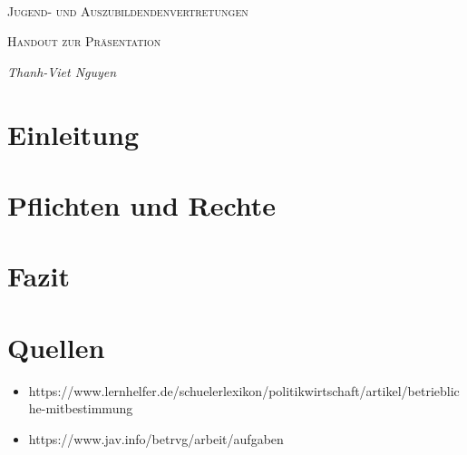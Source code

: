 \documentclass[
  a4paper,            %
  DIV=10,             %
  oneside,            %
  BCOR=5mm,           %
  parskip=half,       %
  numbers=noenddot    %
]{scrartcl}
\begin{document}
\begin{titlepage}
	\centering
	\text{}\vspace{3cm} \\
	{\scshape\LARGE Jugend- und Auszubildendenvertretungen \par}
	\vspace{1cm}
	{\scshape\Large 
		Handout zur Präsentation \par}
	\vspace{1.5cm}
	{\huge\bfseries \par}
	\vspace{2cm}
	{\Large\itshape     	
            Thanh-Viet Nguyen \par}
\vfill
\begingroup
{}		
        \textbf {} %
\endgroup
\end{titlepage}

    \tableofcontents
\clearpage


\section{Einleitung} \label{sec:intro}
    
\section{Pflichten und Rechte} 
    
\section{} 


\newpage

\section{Fazit} \label{conclusion}
  
\section{Quellen}
\begin{itemize}
	\item 
	https://www.lernhelfer.de/schuelerlexikon/politikwirtschaft/artikel/betriebliche-mitbestimmung
	\item 
	https://www.jav.info/betrvg/arbeit/aufgaben
	
\end{itemize}

%
%

\clearpage
\end{document}
